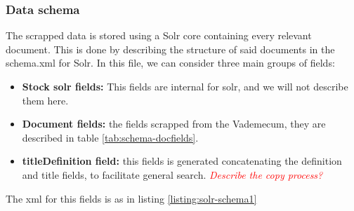 


\subsubsection{Data schema}
\label{subsec:solrschema}

The scrapped data is stored using a Solr core containing every relevant document. This is done by describing the structure of said documents in the schema.xml for Solr. In this file, we can consider three main groups of fields:

\begin{itemize}
 \item \textbf{Stock solr fields: } This fields are internal for solr, and we will not describe them here.
 \item \textbf{Document fields: } the fields scrapped from the Vademecum, they are described in table \ref{tab:schema-docfields}.
 \item \textbf{titleDefinition field: } this fields is generated concatenating the definition and title fields, to facilitate general search. \emph{\textcolor{red}{Describe the copy process?}}

\end{itemize}

The xml for this fields is as in listing \ref{listing:solr-schema1}
\begin{center}
  
\end{center}

